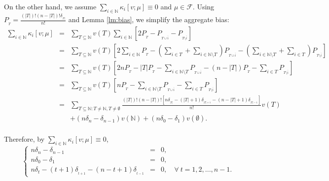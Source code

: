 \documentclass[a4paper,12pt]{article}
\begin{document}
On the other hand, we assume $\sum\limits_{i\in \mathbb{N}} \kappa_i[v;\mu] \equiv 0$ and
$\mu\in \mathscr{F}$. Using $P_{_T} = \frac{(|T|)!(n-|T|)! \delta_{_{|T|}}}{n!}$
and Lemma \ref{lm:bias}, we simplify the aggregate bias:
\begin{equation} \label{eq:total_bias}\tag{A.12}
\begin{array}{rcl}
\sum\limits_{i\in \mathbb{N}} \kappa_i [v;\mu]
&=& 
\sum\limits_{T\subseteq \mathbb{N}} v(T) \sum\limits_{i\in \mathbb{N}} \left [2 P_{_T} - P_{_{T \cup \overline{i}}} - P_{_{T \setminus \overline{i}}} \right ] \\

&=& 
\sum\limits_{T\subseteq \mathbb{N}} v(T) \left[
2\sum\limits_{i\in \mathbb{N}} P_{_T} 
- \left(\sum\limits_{i\in T}+\sum\limits_{i\in \mathbb{N}\setminus T}\right) P_{_{T \cup \overline{i}}} 
- \left(\sum\limits_{i\in \mathbb{N}\setminus T}+\sum\limits_{i\in T}\right) P_{_{T \setminus \overline{i}}} 
\right ] \\

&=& \sum\limits_{T\subseteq \mathbb{N}} v(T) \left [ 2n P_{_T} - |T| P_{_{T}} 
-\sum\limits_{i \in \mathbb{N} \setminus T} P_{_{T \cup \overline{i}}} 
- (n-|T|) P_{_{T}} - \sum\limits_{i \in T} P_{_{T \setminus \overline{i}}} \right ] \\

&=& \sum\limits_{T\subseteq \mathbb{N}} v(T) \left [ n P_{_T} 
-\sum\limits_{i \in \mathbb{N} \setminus T} P_{_{T \cup \overline{i}}} 
- \sum\limits_{i \in T} P_{_{T \setminus \overline{i}}} \right ] \\

&=& \sum\limits_{T\subseteq \mathbb{N}:T\not = \mathbb{N}, T\not = \emptyset}  \frac{(|T|)!(n-|T|)! \left [ n \delta_{_{|T|}}
-(|T|+1) \delta_{_{|T|+1}} - (n-|T|+1) \delta_{_{|T|-1}} \right ] }{n!}  v(T) \\
&& + (n\delta_n - \delta_{n-1}) v(\mathbb{N}) + (n\delta_0 - \delta_{1}) v(\emptyset).  \\
\end{array}
\end{equation}

Therefore, by $\sum\limits_{i\in \mathbb{N}} \kappa_i[v;\mu] \equiv 0$,
$$
\left \{
\begin{array}{rcl}
n\delta_n - \delta_{n-1} &=& 0, \\
n\delta_0 - \delta_{1} &=& 0, \\
n \delta_t -(t+1) \delta_{_{t+1}} - (n-t+1) \delta_{_{t-1}}&=&0, \quad \forall \ t=1,2,...,n-1.
\end{array}
\right .
$$
\end{document}
